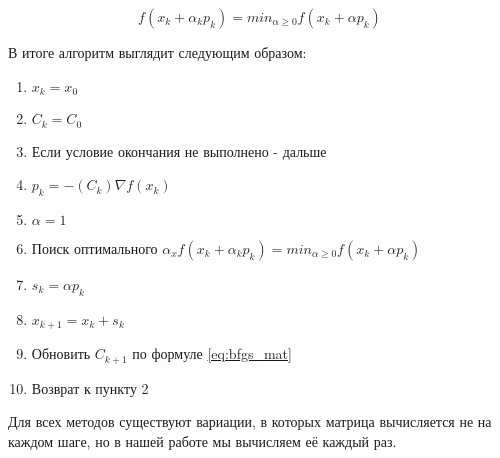 \begin{equation}
f(x_k + \alpha_k p_k) = min_{\alpha \geq 0} f(x_k + \alpha p_k)
\end{equation}

В итоге алгоритм выглядит следующим образом:

\begin{enumerate}
    \item $x_k = x_0$
    \item $C_k = C_0$
    \item Если условие окончания не выполнено - дальше
    \item $p_k = -(C_k){\nabla}f(x_k)$
    \item $\alpha = 1$
    \item Поиск оптимального $\alpha_x f(x_k + \alpha_k p_k) = min_{\alpha \geq 0} f(x_k + \alpha p_k)$
    \item $s_k = \alpha p_k$
    \item $x_{k+1} = x_k + s_k$
    \item Обновить $C_{k+1}$ по формуле \eqref{eq:bfgs_mat}
    \item Возврат к пункту 2
\end{enumerate}

Для всех методов существуют вариации, в которых матрица вычисляется не на каждом шаге, но в нашей работе мы вычисляем её каждый раз.